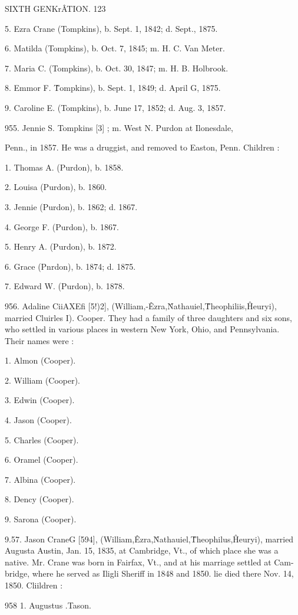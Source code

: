\documentclass{book}
\begin{document}
SIXTH GENKr\^ATION. 123 

5. Ezra Crane (Tompkins), b. Sept. 1, 1842; d. Sept., 1875. 

6. Matilda (Tompkins), b. Oct. 7, 1845; m. H. C. Van Meter. 

7. Maria C. (Tompkins), b. Oct. 30, 1847; m. H. B. Holbrook. 

8. Emmor F. \^Tompkins), b. Sept. 1, 1849; d. April G, 1875. 

9. Caroline E. (Tompkins), b. June 17, 1852; d. Aug. 3, 1857. 

955. Jennie S. Tompkins [3] ; m. West N. Purdon at Ilonesdale, 

Penn., in 1857. He was a druggist, and removed to Easton, 
Penn. Children : 

1. Thomas A. (Purdon), b. 1858. 

2. Louisa (Purdon), b. 1860. 

3. Jennie (Purdon), b. 1862; d. 1867. 

4. George F. (Purdon), b. 1867. 

5. Henry A. (Purdon), b. 1872. 

6. Grace (Pnrdon), b. 1874; d. 1875. 

7. Edward W. (Purdon), b. 1878. 

956. Adaline CiiAXEfi [5!)2], (William,-\^ Ezra,\^ Nathauiel,\^ 
Theophiliis,\^ Heuryi), married Cluirles I). Cooper. They had a 
family of three daughters and six sons, who settled in various 
places in western New York, Ohio, and Pennsylvania. Their 
names were : 

1. Almon (Cooper). 

2. William (Cooper). 

3. Edwin (Cooper). 

4. Jason (Cooper). 

5. Charles (Cooper). 

6. Oramel (Cooper). 

7. Albina (Cooper). 

8. Dency (Cooper). 

9. Sarona (Cooper). 

9.57. Jason CraneG [594], (William,\^ Ezra,\^ Nathauiel,\^ 
Theophilus,\^ Heuryi), married Augusta Austin, Jan. 15, 1835, 
at Cambridge, Vt., of which place she was a native. Mr. Crane 
was born in Fairfax, Vt., and at his marriage settled at Cam- 
bridge, where he served as Iligli Sheriff in 1848 and 1850. lie 
died there Nov. 14, 1850. Cliildren : 

958  1. Augustus .Tason. 
\end{document}
